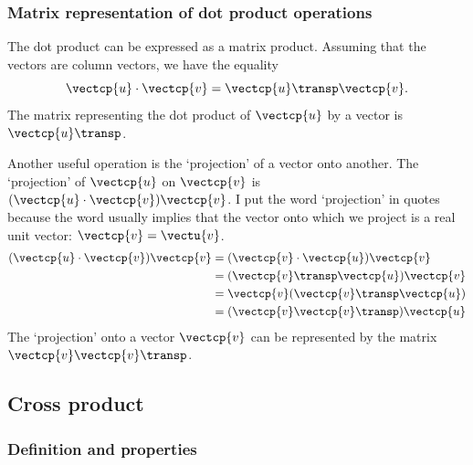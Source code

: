 \begin{refsection}
\subsubsection{Matrix representation of dot product operations}
The dot product can be expressed as a matrix product.
Assuming that the vectors are column vectors, we have the equality
\begin{equation}
    \vectcp{u} \cdot \vectcp{v}
    =
    \vectcp{u}\transp \vectcp{v}
    \text{.}
\end{equation}
The matrix representing the dot product of $\vectcp{u}$ by a vector is $\vectcp{u}\transp$.

Another useful operation is the `projection' of a vector onto another.
The `projection' of $\vectcp{u}$ on $\vectcp{v}$
is $(\vectcp{u} \cdot \vectcp{v})\vectcp{v}$.
I put the word `projection' in quotes because the word usually implies that the vector onto which we project is a real unit vector: $\vectcp{v}=\vectu{v}$.
\begin{subequations}  
    \label{eq:projection_matrix}
    \begin{align}
        (\vectcp{u} \cdot \vectcp{v})\vectcp{v}
        &=
        (\vectcp{v} \cdot \vectcp{u})\vectcp{v}
        \\
        &=
        (\vectcp{v}\transp \vectcp{u})\vectcp{v}
        \\
        &=
        \vectcp{v}(\vectcp{v}\transp \vectcp{u})
        \\
        &=
        (\vectcp{v} \vectcp{v}\transp) \vectcp{u}
    \end{align}
\end{subequations}
The `projection' onto a vector $\vectcp{v}$ can be represented by the matrix $\vectcp{v} \vectcp{v}\transp$.






\subsection{Cross product}

\subsubsection{Definition and properties}


\end{refsection}
